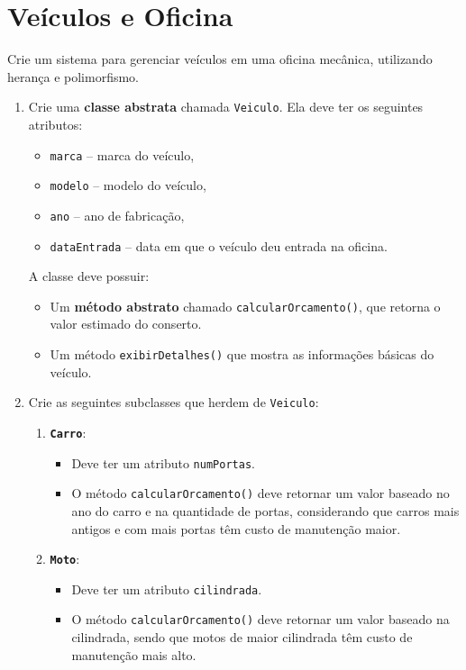 \documentclass{article}
\begin{document}
\section{Veículos e Oficina}

Crie um sistema para gerenciar veículos em uma oficina mecânica, utilizando herança e polimorfismo.

\begin{enumerate}
    \item Crie uma \textbf{classe abstrata} chamada \texttt{Veiculo}.
          Ela deve ter os seguintes atributos:
          \begin{itemize}
              \item \texttt{marca} -- marca do veículo,
              \item \texttt{modelo} -- modelo do veículo,
              \item \texttt{ano} -- ano de fabricação,
              \item \texttt{dataEntrada} -- data em que o veículo deu entrada na oficina.
          \end{itemize}

          A classe deve possuir:
          \begin{itemize}
              \item Um \textbf{método abstrato} chamado \texttt{calcularOrcamento()}, que retorna o valor estimado do conserto.
              \item Um método \texttt{exibirDetalhes()} que mostra as informações básicas do veículo.
          \end{itemize}

    \item Crie as seguintes subclasses que herdem de \texttt{Veiculo}:
          \begin{enumerate}
              \item \textbf{\texttt{Carro}}:
                    \begin{itemize}
                        \item Deve ter um atributo \texttt{numPortas}.
                        \item O método \texttt{calcularOrcamento()} deve retornar um valor baseado no ano do carro e na quantidade de portas, considerando que carros mais antigos e com mais portas têm custo de manutenção maior.
                    \end{itemize}

              \item \textbf{\texttt{Moto}}:
                    \begin{itemize}
                        \item Deve ter um atributo \texttt{cilindrada}.
                        \item O método \texttt{calcularOrcamento()} deve retornar um valor baseado na cilindrada, sendo que motos de maior cilindrada têm custo de manutenção mais alto.
                    \end{itemize}
          \end{enumerate}


\end{enumerate}
\end{document}
